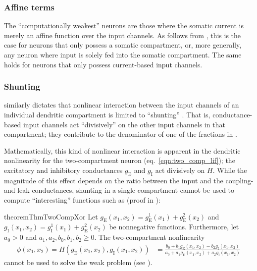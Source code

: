 \subsubsection{Affine terms}
The \enquote{computationally weakest} \nlif neurons are those where the somatic current is merely an affine function over the input channels.
As follows from , this is the case for \nlif neurons that only possess a somatic compartment, or, more generally, any \nlif neuron where input is solely fed into the somatic compartment.
The same holds for \nlif neurons that only possess current-based input channels.

\subsubsection{Shunting}
 similarly dictates that nonlinear interaction between the input channels of an individual dendritic compartment is limited to \enquote{shunting} \citep[cf.][Section~1.5]{koch1999biophysics}.
That is, conductance-based input channels act \enquote{divisively} on the other input channels in that compartment; they contribute to the denominator of one of the fractions in .

Mathematically, this kind of nonlinear interaction is apparent in the dendritic nonlinearity for the two-compartment neuron (eq.~\ref{eqn:two_comp_lif}); the excitatory and inhibitory conductances $g_\mathrm{E}$ and $g_\mathrm{I}$ act divisively on $H$.
While the magnitude of this effect depends on the ratio between the input and the coupling- and leak-conductances, shunting in a single compartment cannot be used to compute \enquote{interesting} functions such as \XOR (proof in ):
\begin{restatable}{theorem}{ThmTwoCompXor}
\label{thm:two_comp_xor}
Let $g_\mathrm{E}(x_1, x_2) = g_\mathrm{E}^1(x_1) + g_\mathrm{E}^2(x_2)$ and $g_\mathrm{I}(x_1, x_2) = g_\mathrm{I}^1(x_1) + g_\mathrm{E}^2(x_2)$ be nonnegative functions.
Furthermore, let $a_0 > 0$ and $a_1, a_2, b_0, b_1, b_2 \geq 0$.
The two-compartment \LIF nonlinearity
\begin{align*}
	\phi(x_1, x_2) = H(g_\mathrm{E}(x_1, x_2), g_\mathrm{I}(x_1, x_2)) &= \frac{b_0 + b_1 g_\mathrm{E}(x_1, x_2) - b_2 g_\mathrm{I}(x_1, x_2)}{a_0 + a_1 g_\mathrm{E}(x_1, x_2) + a_2 g_\mathrm{I}(x_1, x_2)}
\end{align*}
cannot be used to solve the weak \XOR problem (see ).
\end{restatable}


